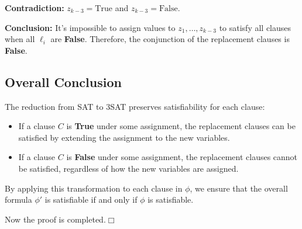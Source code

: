 \documentclass[a4paper]{article}
\begin{document}
\textbf{Contradiction:} \( z_{k-3} = \text{True} \) and \( z_{k-3} = \text{False} \).

\textbf{Conclusion:} It's impossible to assign values to \( z_1, \ldots, z_{k-3} \) to satisfy all clauses when all \( \ell_i \) are \textbf{False}. Therefore, the conjunction of the replacement clauses is \textbf{False}.


\subsection*{Overall Conclusion}

The reduction from SAT to 3SAT preserves satisfiability for each clause:

\begin{itemize}
    \item If a clause \( C \) is \textbf{True} under some assignment, the replacement clauses can be satisfied by extending the assignment to the new variables.
    \item If a clause \( C \) is \textbf{False} under some assignment, the replacement clauses cannot be satisfied, regardless of how the new variables are assigned.
\end{itemize}

By applying this transformation to each clause in \( \phi \), we ensure that the overall formula \( \phi' \) is satisfiable if and only if \( \phi \) is satisfiable.


Now the proof is completed.$\Box$
\end{document}
